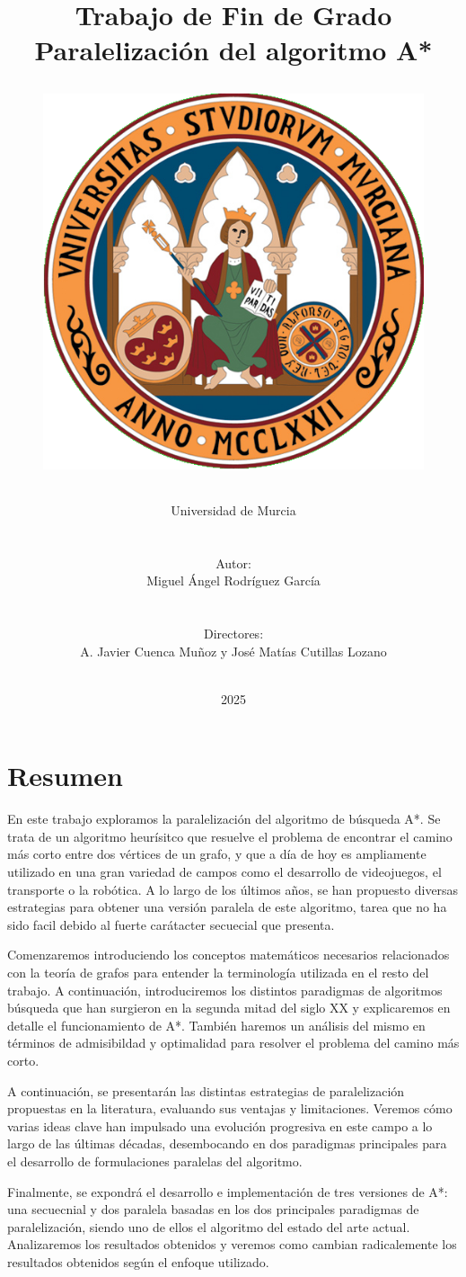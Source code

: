 \documentclass[a4paper,12pt]{article}
\title{{\Large{Trabajo de Fin de Grado}} \\
        \vspace{1.25cm}
        {{\textbf{Paralelización del algoritmo A*}}}  \\
















	
	






        
        \vspace{1cm}
        \begin{figure}[htbp]
            \centering
	        \includegraphics[scale=0.25]{./images/logo-um.png}
        \end{figure}
}
\author{\Large{Universidad de Murcia} \\
    \\
    \\
    Autor:
    \\
    \large{Miguel Ángel Rodríguez García} \\
    \\
    \\
    Directores:
    \\
    \large{A. Javier Cuenca Muñoz y José Matías Cutillas Lozano}
    \\
    \\
}
\date{\Large{2025}}
\begin{document}

\setlength{\parskip}{0.15cm}

\maketitle
\thispagestyle{empty}


\newpage

\null\cleardoublepage

\newpage

\section*{Resumen}

En este trabajo exploramos la paralelización del algoritmo de búsqueda A*. Se trata de un algoritmo heurísitco que resuelve el problema de encontrar el camino más corto entre dos vértices de un grafo, y que a día de hoy es ampliamente utilizado en una gran variedad de campos como el desarrollo de videojuegos, el transporte o la robótica. A lo largo de los últimos años, se han propuesto diversas estrategias para obtener una versión paralela de este algoritmo, tarea que no ha sido facil debido al fuerte carátacter secuecial que presenta.

Comenzaremos introduciendo los conceptos matemáticos necesarios relacionados con la teoría de grafos para entender la terminología utilizada en el resto del trabajo. A continuación, introduciremos los distintos paradigmas de algoritmos búsqueda que han surgieron en la segunda mitad del siglo XX y explicaremos en detalle el funcionamiento de A*. También haremos un análisis del mismo en términos de admisibildad y optimalidad para resolver el problema del camino más corto.

A continuación, se presentarán las distintas estrategias de paralelización propuestas en la literatura, evaluando sus ventajas y limitaciones. Veremos cómo varias ideas clave han impulsado una evolución progresiva en este campo a lo largo de las últimas décadas, desembocando en dos paradigmas principales para el desarrollo de formulaciones paralelas del algoritmo.

Finalmente, se expondrá el desarrollo e implementación de tres versiones de A*: una secuecnial y dos paralela basadas en los dos principales paradigmas de paralelización, siendo uno de ellos el algoritmo del estado del arte actual. Analizaremos los resultados obtenidos y veremos como cambian radicalemente los resultados obtenidos según el enfoque utilizado.
\end{document}
